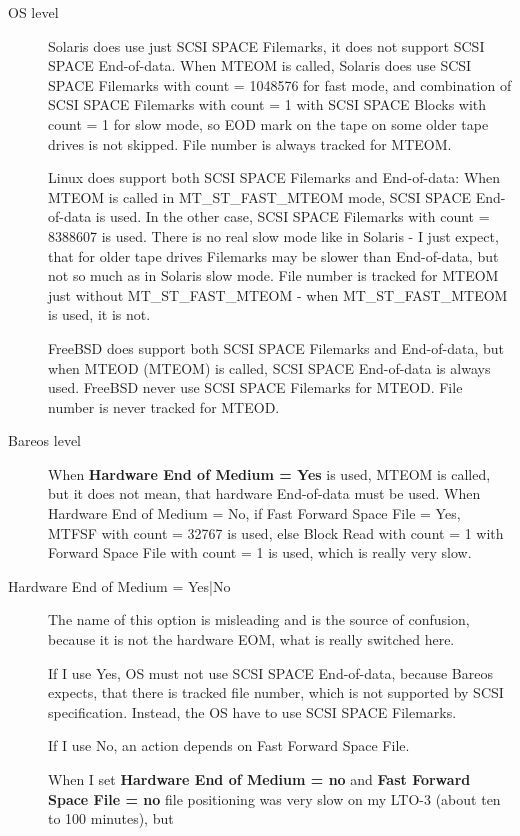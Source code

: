 {\begin{description}
\item[OS level]
  Solaris does use just SCSI SPACE Filemarks, it does not support SCSI
  SPACE End-of-data.  When MTEOM is called, Solaris does use SCSI SPACE
  Filemarks with count = 1048576 for fast mode, and combination of SCSI
  SPACE Filemarks with count = 1 with SCSI SPACE Blocks with count = 1 for
  slow mode, so EOD mark on the tape on some older tape drives is not
  skipped.  File number is always tracked for MTEOM.

  Linux does support both SCSI SPACE Filemarks and End-of-data: When MTEOM
  is called in MT\_ST\_FAST\_MTEOM mode, SCSI SPACE End-of-data is used.
  In the other case, SCSI SPACE Filemarks with count =
  8388607 is used.
  There is no real slow mode like in Solaris - I just expect, that for
  older tape drives Filemarks may be slower than End-of-data, but not so
  much as in Solaris slow mode.  File number is tracked for MTEOM just
  without MT\_ST\_FAST\_MTEOM - when MT\_ST\_FAST\_MTEOM is used, it is not.

  FreeBSD does support both SCSI SPACE Filemarks and End-of-data, but when
  MTEOD (MTEOM) is called, SCSI SPACE End-of-data is always used.  FreeBSD
  never use SCSI SPACE Filemarks for MTEOD. File number is never tracked
  for MTEOD.

\item[Bareos level]
  When {\bf Hardware End of Medium = Yes} is used, MTEOM is called, but it
  does not mean, that hardware End-of-data must be used.  When Hardware End
  of Medium = No, if Fast Forward Space File = Yes, MTFSF with count =
  32767 is used, else Block Read with count = 1 with Forward Space File
  with count = 1 is used, which is really very slow.

\item [Hardware End of Medium = Yes|No]
  The name of this option is misleading and is the source of confusion,
  because it is not the hardware EOM, what is really switched here.

  If I use Yes, OS must not use SCSI SPACE End-of-data, because Bareos
  expects, that there is tracked file number, which is not supported by
  SCSI specification.  Instead, the OS have to use SCSI SPACE Filemarks.

  If I use No, an action depends on Fast Forward Space File.

  When I set {\bf Hardware End of Medium = no}
  and {\bf Fast Forward Space File = no}
  file positioning was very slow
  on my LTO-3 (about ten to 100 minutes), but


\end{description}}
